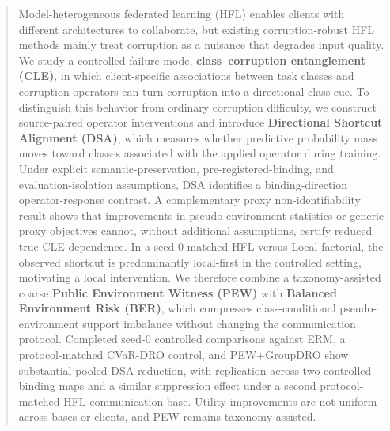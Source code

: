 \begin{abstract}

Model-heterogeneous federated learning (HFL) enables clients with different architectures to collaborate, but existing corruption-robust HFL methods mainly treat corruption as a nuisance that degrades input quality. We study a controlled failure mode, \textbf{class--corruption entanglement (CLE)}, in which client-specific associations between task classes and corruption operators can turn corruption into a directional class cue. To distinguish this behavior from ordinary corruption difficulty, we construct source-paired operator interventions and introduce \textbf{Directional Shortcut Alignment (DSA)}, which measures whether predictive probability mass moves toward classes associated with the applied operator during training. Under explicit semantic-preservation, pre-registered-binding, and evaluation-isolation assumptions, DSA identifies a binding-direction operator-response contrast. A complementary proxy non-identifiability result shows that improvements in pseudo-environment statistics or generic proxy objectives cannot, without additional assumptions, certify reduced true CLE dependence. In a seed-0 matched HFL-versus-Local factorial, the observed shortcut is predominantly local-first in the controlled setting, motivating a local intervention. We therefore combine a taxonomy-assisted coarse \textbf{Public Environment Witness (PEW)} with \textbf{Balanced Environment Risk (BER)}, which compresses class-conditional pseudo-environment support imbalance without changing the communication protocol. Completed seed-0 controlled comparisons against ERM, a protocol-matched CVaR-DRO control, and PEW+GroupDRO show substantial pooled DSA reduction, with replication across two controlled binding maps and a similar suppression effect under a second protocol-matched HFL communication base. Utility improvements are not uniform across bases or clients, and PEW remains taxonomy-assisted.

\end{abstract}
